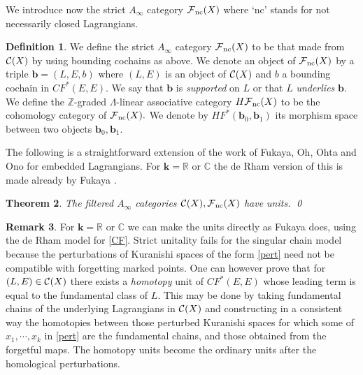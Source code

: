 \documentclass{article}
\theoremstyle{plain}%
\newtheorem{thm}{Theorem}[section]
\theoremstyle{definition}
\newtheorem{dfn}[thm]{Definition}
\newtheorem{rem}[thm]{Remark}
\numberwithin{equation}{section}
\numberwithin{figure}{section}
\def\eq{\eqref}
\def\l{\label}
\def\cC{{\mathbin{\cal C}}}
\def\cF{{\mathbin{\cal F}}}
\def\C{{\mathbin{\mathbb C}}}\def\N{{\mathbb N}}
\def\R{{\mathbin{\mathbb R}}}
\def\Z{{\mathbin{\mathbb Z}}}
\def\La{\Lambda}
\def\iy{\infty}
\def\k{{\mathbf{k}}}\def\b{{\mathbf{b}}}\def\x{{\mathbf{x}}}
\begin{document}
We introduce now the strict $A_\iy$ category $\cF_\nc(X)$ where `nc' stands for not necessarily closed Lagrangians.
\begin{dfn}\l{dfn: bound coch}
We define the strict $A_\iy$ category $\cF_\nc(X)$ to be that made from $\cC(X)$ by using bounding cochains as above. 
We denote an object of $\cF_\nc(X)$ by a triple $\b=(L,E,b)$ where $(L,E)$ is an object of $\cC(X)$ and $b$ a bounding cochain in $CF^*(E,E).$
We say that $\b$ is {\it supported} on $L$ or that $L$ {\it underlies} $\b.$
We define the $\Z$-graded $\La$-linear associative category $H\cF_\nc(X)$ to be the cohomology category of $\cF_\nc(X).$
We denote by $HF^*(\b_0,\b_1)$ its morphism space between two objects $\b_0,\b_1.$
\end{dfn}
The following is a straightforward extension of the work of Fukaya, Oh, Ohta and Ono \cite[\S7.3]{FOOO} for embedded Lagrangians. For $\k=\R$ or $\C$ the de Rham version of this is made already by Fukaya \cite{Fuk}.
\begin{thm}\l{thm: unit}
The filtered $A_\iy$ categories $\cC(X),\cF_\nc(X)$ have units. \qed
\end{thm}
\begin{rem}\l{rem: unit}
For $\k=\R$ or $\C$ we can make the units directly as Fukaya \cite{Fuk} does, using the de Rham model for \eq{CF}. Strict unitality fails for the singular chain model because the perturbations of Kuranishi spaces of the form \eq{pert} need not be compatible with forgetting marked points. One can however prove that for $(L,E)\in \cC(X)$ there exists a {\it homotopy} unit of $CF^*(E,E)$ whose leading term is equal to the fundamental class of $L.$ This may be done by taking fundamental chains of the underlying Lagrangians in $\cC(X)$ and constructing in a consistent way the homotopies between those perturbed Kuranishi spaces for which some of $x_1,\cdots,x_k$ in \eq{pert} are the fundamental chains, and those obtained from the forgetful maps. The homotopy units become the ordinary units after the homological perturbations.
\end{rem}
\end{document}
